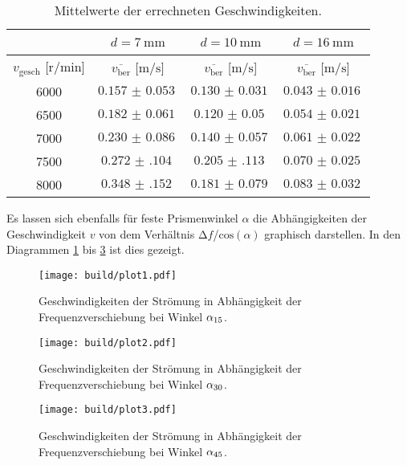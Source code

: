 \begin{table}
    \centering
    \caption{Mittelwerte der errechneten Geschwindigkeiten.}
    \label{tab:7}
    \begin{tabular}{c || c | c | c}
        \multicolumn{1}{c}{~} & \multicolumn{1}{c}{$d = \SI{7}{\milli\meter}$} & \multicolumn{1}{c}{$d = \SI{10}{\milli\meter}$} & \multicolumn{1}{c}{$d = \SI{16}{\milli\meter}$}\\
        \toprule
        $v_{\text{gesch}}$ [$\si{{\text{r}}\per\minute}$]  & $\overline{v_{\text{ber}}}$ [$\si{\meter\per\second}$] &  $\overline{v_{\text{ber}}}$ [$\si{\meter\per\second}$] & $\overline{v_{\text{ber}}}$ [$\si{\meter\per\second}$] \\
        \midrule
        6000    &  $\SI{0.157(53)}{}$    & $\SI{0.130(31)}{}$   & $\SI{0.043(16)}{}$   \\ 
        6500    &  $\SI{0.182(61)}{}$    & $\SI{0.120(50)}{}$   & $\SI{0.054(21)}{}$   \\ 
        7000    &  $\SI{0.230(86)}{}$    & $\SI{0.140(57)}{}$   & $\SI{0.061(22)}{}$   \\ 
        7500    &  $\SI{0.272(104)}{}$   & $\SI{0.205(113)}{}$  & $\SI{0.070(25)}{}$  \\ 
        8000    &  $\SI{0.348(152)}{}$   & $\SI{0.181(79)}{}$   & $\SI{0.083(32)}{}$   \\  
        \bottomrule
    \end{tabular}
\end{table}

Es lassen sich ebenfalls für feste Prismenwinkel $\alpha$ die Abhängigkeiten der Geschwindigkeit $v$ von dem Verhältnis $\increment f$/$\text{cos}(\alpha)$ graphisch darstellen. 
In den Diagrammen \ref{fig:plot1} bis \ref{fig:plot3} ist dies gezeigt.

\begin{figure}
    \centering
    \texttt{[image: build/plot1.pdf]}
    \caption{Geschwindigkeiten der Strömung in Abhängigkeit der Frequenzverschiebung bei Winkel $\protect \alpha_{15}$.} 
    \label{fig:plot1}
\end{figure}
\begin{figure}
    \centering
    \texttt{[image: build/plot2.pdf]}
    \caption{Geschwindigkeiten der Strömung in Abhängigkeit der Frequenzverschiebung bei Winkel $\protect \alpha_{30}$.} 
    \label{fig:plot2}
\end{figure}
\begin{figure}
    \centering
    \texttt{[image: build/plot3.pdf]}
    \caption{Geschwindigkeiten der Strömung in Abhängigkeit der Frequenzverschiebung bei Winkel $\protect \alpha_{45}$.} 
    \label{fig:plot3}
\end{figure}

